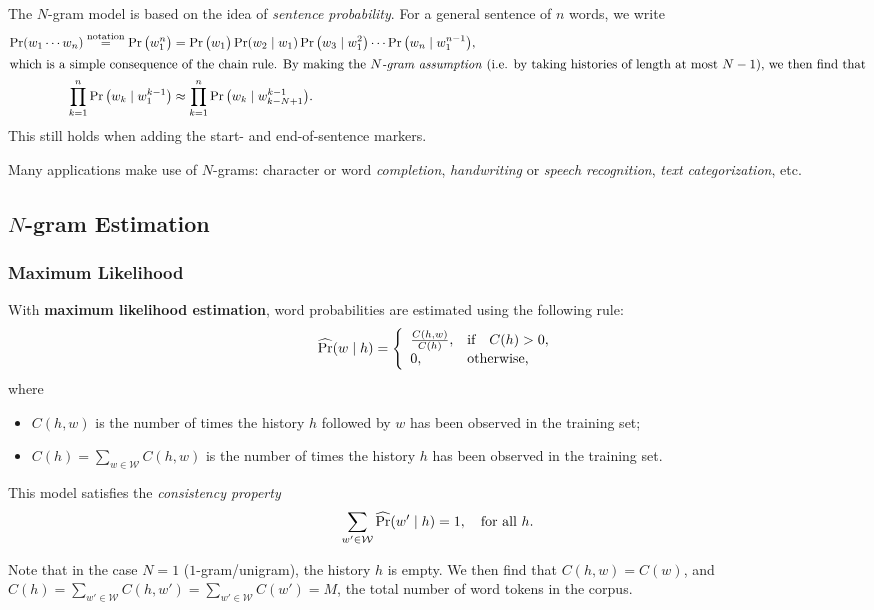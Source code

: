The \(N\)-gram model is based on the idea of \emph{sentence probability}.
For a general sentence of \(n\) words, we write
\begin{align*}
\Pr(w_1\cdots w_n) \overset{\textnormal{notation}}{=} \Pr\big(w_1^n\big) &= \Pr\big(w_1\big) \Pr(w_2 \mid w_1) \Pr\big(w_3 \mid w_1^2\big) \cdots \Pr\big(w_n \mid w_1^{n-1}\big),\\
\intertext{which is a simple consequence of the chain rule.
By making the \emph{\(N\)-gram assumption} (i.e. by taking histories of length at most \(N-1\)), we then find that}
\prod_{k=1}^n \Pr\big(w_k \mid w_1^{k-1}\big) &\approx \prod_{k=1}^n \Pr\big(w_k \mid w_{k - N + 1}^{k-1}\big).
\end{align*}
This still holds when adding the start- and end-of-sentence markers.

Many applications make use of \(N\)-grams: character or word \emph{completion}, \emph{handwriting} or \emph{speech recognition}, \emph{text categorization}, etc.

\subsection{\(N\)-gram Estimation}
\subsubsection{Maximum Likelihood}
With \textbf{maximum likelihood estimation}, word probabilities are estimated using the following rule:
\[
\Prhat(w \mid h) = \left\{\begin{array}{l@{\quad}l}
\frac{C(h, w)}{C(h)}, & \textnormal{if} \quad C(h) > 0,\\
0, & \textnormal{otherwise,}
\end{array}\right.
\]
where
\begin{itemize}
	\item \(C(h, w)\) is the number of times the history \(h\) followed by \(w\) has been observed in the training set;
	\item \(C(h) = \sum_{w \in \mathcal{W}} C(h, w)\) is the number of times the history \(h\) has been observed in the training set.
\end{itemize}
This model satisfies the \emph{consistency property}
\[
\sum_{w' \in \mathcal{W}} \operatorname{\widehat{\Pr}}(w' \mid h) = 1, \quad \textnormal{for all } h.
\]

Note that in the case \(N=1\) (\(1\)-gram/unigram), the history \(h\) is empty.
We then find that \(C(h, w) = C(w)\), and \(C(h) = \sum_{w' \in \mathcal{W}} C(h, w') = \sum_{w' \in \mathcal{W}} C(w') = M\), the total number of word tokens in the corpus.


